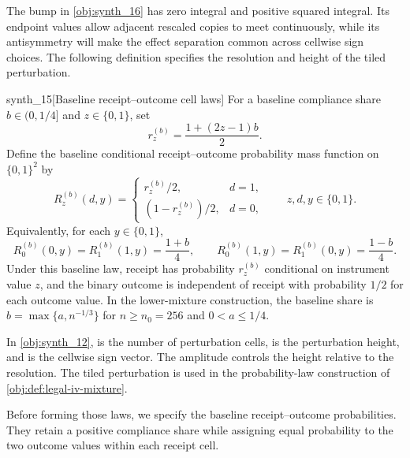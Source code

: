 The bump  in \cref{obj:synth_16} has zero integral and positive squared integral. Its endpoint values allow adjacent rescaled copies to meet continuously, while its antisymmetry will make the effect separation common across cellwise sign choices. The following definition specifies the resolution and height of the tiled perturbation.

\begin{definitionv}{synth_15}[Baseline receipt–outcome cell laws]
For a baseline compliance share \(b\in(0,1/4]\) and \(z\in\{0,1\}\), set
\[
r_z^{(b)}=\frac{1+(2z-1)b}{2}.
\]
Define the baseline conditional receipt–outcome probability mass function on \(\{0,1\}^2\) by
\[
R_z^{(b)}(d,y)=
\begin{cases}
r_z^{(b)}/2,&d=1,\\
(1-r_z^{(b)})/2,&d=0,
\end{cases}
\qquad z,d,y\in\{0,1\}.
\]
Equivalently, for each \(y\in\{0,1\}\),
\[
R_0^{(b)}(0,y)=R_1^{(b)}(1,y)=\frac{1+b}{4},
\qquad
R_0^{(b)}(1,y)=R_1^{(b)}(0,y)=\frac{1-b}{4}.
\]
Under this baseline law, receipt has probability \(r_z^{(b)}\) conditional on instrument value \(z\), and the binary outcome is independent of receipt with probability \(1/2\) for each outcome value. In the lower-mixture construction, the baseline share is \(b=\max\{a,n^{-1/3}\}\) for \(n\ge n_0=256\) and \(0<a\le1/4\).
\end{definitionv}

In \cref{obj:synth_12},  is the number of perturbation cells,  is the perturbation height, and  is the cellwise sign vector. The amplitude  controls the height relative to the resolution. The tiled perturbation  is used in the probability-law construction of \cref{obj:def:legal-iv-mixture}.

Before forming those laws, we specify the baseline receipt--outcome probabilities. They retain a positive compliance share while assigning equal probability to the two outcome values within each receipt cell.

